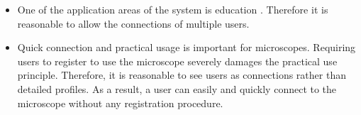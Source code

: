 \begin{itemize}
	\item One of the application areas of the system is education \cite{education}. Therefore it is reasonable to allow the connections of multiple users.
	\item Quick connection and practical usage is important for microscopes. Requiring users to register to use the microscope severely damages the practical use principle. Therefore, it is reasonable to see users as connections rather than detailed profiles. As a result, a user can easily and quickly connect to the microscope without any registration procedure.
\end{itemize}
